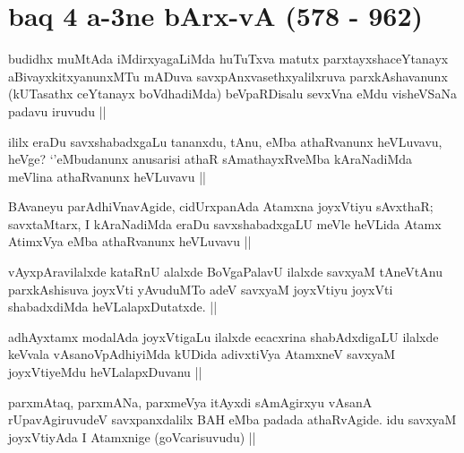 \section*{baq 4 a-3ne bArx-vA (578 - 962)}


\begin{artha}
budidhx muMtAda iMdirxyagaLiMda huTuTxva matutx parxtayxshaceYtanayx aBivayxkitxyanunxMTu mADuva savxpAnxvasethxyalilxruva parxkAshavanunx (kUTasathx ceYtanayx boVdhadiMda) beVpaRDisalu sevxVna eMdu visheVSaNa padavu iruvudu ||
\end{artha}

\begin{artha}
ililx eraDu savxshabadxgaLu tananxdu, tAnu, eMba athaRvanunx heVLuvavu, heVge? `\stext'eMbudanunx anusarisi athaR sAmathayxRveMba kAraNadiMda meVlina athaRvanunx heVLuvavu ||
\end{artha}

\begin{artha}
BAvaneyu parAdhiVnavAgide, cidUrxpanAda Atamxna joyxVtiyu sAvxthaR; savxtaMtarx, I kAraNadiMda eraDu savxshabadxgaLU meVle heVLida Atamx AtimxVya eMba athaRvanunx heVLuvavu ||
\end{artha}


\begin{artha}
vAyxpAravilalxde kataRnU alalxde BoVgaPalavU ilalxde savxyaM tAneVtAnu parxkAshisuva joyxVti yAvuduMTo adeV savxyaM joyxVtiyu joyxVti shabadxdiMda heVLalapxDutatxde. ||
\end{artha}


\begin{artha}
adhAyxtamx modalAda joyxVtigaLu ilalxde ecacxrina shabAdxdigaLU ilalxde keVvala vAsanoVpAdhiyiMda kUDida adivxtiVya AtamxneV savxyaM joyxVtiyeMdu heVLalapxDuvanu ||
\end{artha}


\begin{artha}
parxmAtaq, parxmANa, parxmeVya itAyxdi sAmAgirxyu vAsanA rUpavAgiruvudeV savxpanxdalilx BAH eMba padada athaRvAgide. idu savxyaM joyxVtiyAda I Atamxnige (goVcarisuvudu) ||
\end{artha}


